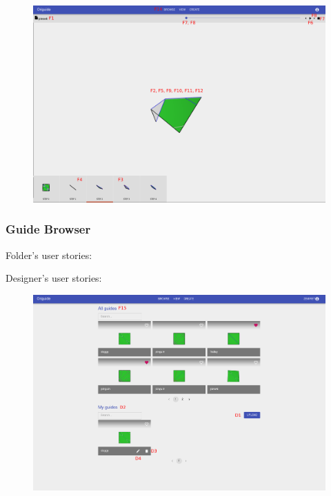 \begin{figure}[H]
  	\centering
    \includegraphics[width=\textwidth]{assets/5-guideViewer.png}
\end{figure}

\subsubsection{Guide Browser}

Folder's user stories:
\begin{enumerate}
	\setcounter{enumi}{14}
\end{enumerate}

Designer's user stories:
\begin{enumerate}
	\setcounter{enumi}{0}
\end{enumerate}

\begin{figure}[H]
  	\centering
    \includegraphics[width=\textwidth]{assets/5-guideBrowser.png}
\end{figure}

